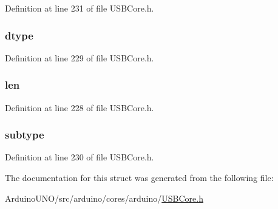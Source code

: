 Definition at line 231 of file U\+S\+B\+Core.\+h.

\hypertarget{struct_a_c_m_functional_descriptor_a0bb419531ec75697e63e9109fecf81b0}{}
\subsubsection[{dtype}]{ dtype}\label{struct_a_c_m_functional_descriptor_a0bb419531ec75697e63e9109fecf81b0}


Definition at line 229 of file U\+S\+B\+Core.\+h.

\hypertarget{struct_a_c_m_functional_descriptor_afbf3f3230446569534d5f466aaf4c23b}{}
\subsubsection[{len}]{ len}\label{struct_a_c_m_functional_descriptor_afbf3f3230446569534d5f466aaf4c23b}


Definition at line 228 of file U\+S\+B\+Core.\+h.

\hypertarget{struct_a_c_m_functional_descriptor_afb82dd1313bc5284e4e5aef8218ef414}{}
\subsubsection[{subtype}]{ subtype}\label{struct_a_c_m_functional_descriptor_afb82dd1313bc5284e4e5aef8218ef414}


Definition at line 230 of file U\+S\+B\+Core.\+h.



The documentation for this struct was generated from the following file\+:\begin{DoxyCompactItemize}
\item 
Arduino\+U\+N\+O/src/arduino/cores/arduino/\hyperlink{_u_s_b_core_8h}{U\+S\+B\+Core.\+h}\end{DoxyCompactItemize}
